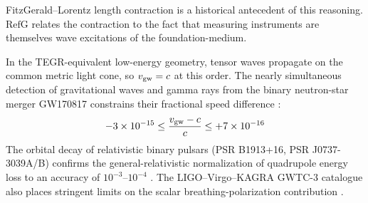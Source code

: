 \documentclass[11pt,a4paper]{article}
\newcommand{\RefG}{\mathrm{RefG}}
\begin{document}
FitzGerald--Lorentz length contraction \citep{fitzgerald1889,lorentz1892} is a historical antecedent of this reasoning. $\RefG$ relates the contraction to the fact that measuring instruments are themselves wave excitations of the foundation-medium.

In the TEGR-equivalent low-energy geometry, tensor waves propagate on the common metric light cone, so $v_{\rm gw}=c$ at this order. The nearly simultaneous detection of gravitational waves and gamma rays from the binary neutron-star merger GW170817 constrains their fractional speed difference \citep{abbott2017}:
\begin{equation}
-3 \times 10^{-15} \le \frac{v_{\rm gw} - c}{c} \le +7 \times 10^{-16}
\end{equation}
The orbital decay of relativistic binary pulsars (PSR B1913+16, PSR J0737-3039A/B) confirms the general-relativistic normalization of quadrupole energy loss to an accuracy of $10^{-3}$--$10^{-4}$ \citep{weisberg2016,kramer2021}. The LIGO--Virgo--KAGRA GWTC-3 catalogue also places stringent limits on the scalar breathing-polarization contribution \citep{ligovirgokagra2022}.
\end{document}
